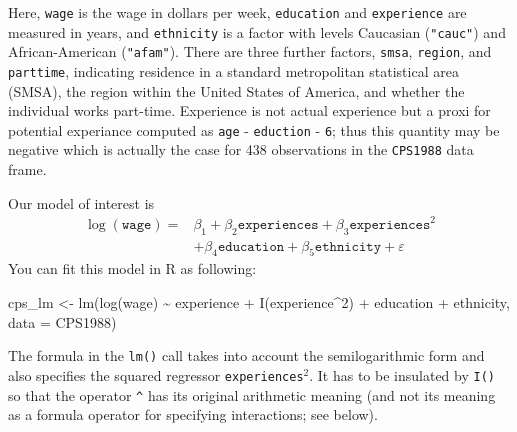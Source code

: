 \documentclass[
  14pt,
]{memoir}
\newenvironment{Shaded}{\begin{snugshade}}{\end{snugshade}}
\newcommand{\AttributeTok}[1]{\textcolor[rgb]{0.77,0.63,0.00}{#1}}
\newcommand{\DecValTok}[1]{\textcolor[rgb]{0.00,0.00,0.81}{#1}}
\newcommand{\FunctionTok}[1]{\textcolor[rgb]{0.00,0.00,0.00}{#1}}
\newcommand{\NormalTok}[1]{#1}
\newcommand{\OtherTok}[1]{\textcolor[rgb]{0.56,0.35,0.01}{#1}}
\newcommand{\SpecialCharTok}[1]{\textcolor[rgb]{0.00,0.00,0.00}{#1}}
\begin{document}
Here, \texttt{wage} is the wage in dollars per week, \texttt{education} and \texttt{experience}
are measured in years, and \texttt{ethnicity} is a factor with levels Caucasian
(\texttt{"cauc"}) and African-American (\texttt{"afam"}). There are three further factors,
\texttt{smsa}, \texttt{region}, and \texttt{parttime}, indicating residence in a standard metropolitan
statistical area (SMSA), the region within the United States of America, and
whether the individual works part-time. Experience is not actual experience but a proxi for potential experiance computed as \texttt{age} - \texttt{eduction} - \texttt{6}; thus this quantity may be negative which is actually the case for 438 observations in the \texttt{CPS1988} data frame.

Our model of interest is
\begin{align*}
\log(\texttt{wage})=&\beta_1 + \beta_2 \texttt{experiences} + \beta_3 \texttt{experiences}^2 \\
&+\beta_4 \texttt{education} +\beta_5 \texttt{ethnicity} + \varepsilon  
\end{align*}
You can fit this model in \textsf{R} as following:

\begin{Shaded}
\begin{Highlighting}[]
\NormalTok{cps\_lm }\OtherTok{\textless{}{-}} \FunctionTok{lm}\NormalTok{(}\FunctionTok{log}\NormalTok{(wage) }\SpecialCharTok{\textasciitilde{}}\NormalTok{ experience }\SpecialCharTok{+} \FunctionTok{I}\NormalTok{(experience}\SpecialCharTok{\^{}}\DecValTok{2}\NormalTok{) }\SpecialCharTok{+} 
\NormalTok{               education }\SpecialCharTok{+}\NormalTok{ ethnicity, }\AttributeTok{data =}\NormalTok{ CPS1988)}
\end{Highlighting}
\end{Shaded}

The formula in the \texttt{lm()} call takes into account the semilogarithmic form and
also specifies the squared regressor \texttt{experiences}\(^2\). It has to be insulated by
\texttt{I()} so that the operator \texttt{\^{}} has its original arithmetic meaning (and not its
meaning as a formula operator for specifying interactions; see below).
\end{document}
